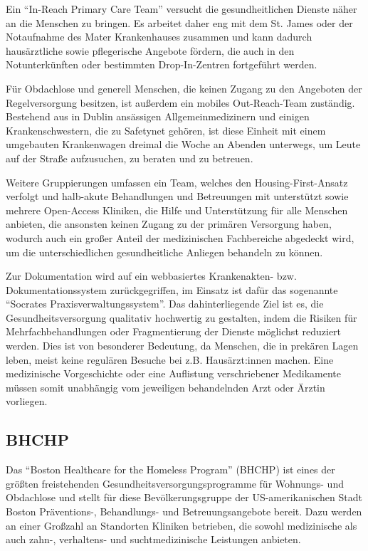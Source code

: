 Ein \enquote{In-Reach Primary Care Team} versucht die gesundheitlichen Dienste näher an die Menschen zu bringen. Es arbeitet daher eng mit dem St. James oder der Notaufnahme des Mater Krankenhauses zusammen und kann dadurch hausärztliche sowie pflegerische Angebote fördern, die auch in den Notunterkünften oder bestimmten Drop-In-Zentren fortgeführt werden.

Für Obdachlose und generell Menschen, die keinen Zugang zu den Angeboten der Regelversorgung besitzen, ist außerdem ein mobiles Out-Reach-Team zuständig. Bestehend aus in Dublin ansässigen Allgemeinmedizinern und einigen Krankenschwestern, die zu Safetynet gehören, ist diese Einheit mit einem umgebauten Krankenwagen dreimal die Woche an Abenden unterwegs, um Leute auf der Straße aufzusuchen, zu beraten und zu betreuen.

Weitere Gruppierungen umfassen ein Team, welches den Housing-First-Ansatz verfolgt und halb-akute Behandlungen und Betreuungen mit unterstützt sowie mehrere Open-Access Kliniken, die Hilfe und Unterstützung für alle Menschen anbieten, die ansonsten keinen Zugang zu der primären Versorgung haben, wodurch auch ein großer Anteil der medizinischen Fachbereiche abgedeckt wird, um die unterschiedlichen gesundheitliche Anliegen behandeln zu können.

Zur Dokumentation wird auf ein webbasiertes Krankenakten- bzw. Dokumentationssystem zurückgegriffen, im Einsatz ist dafür das sogenannte \enquote{Socrates Praxisverwaltungssystem}. Das dahinterliegende Ziel ist es, die Gesundheitsversorgung qualitativ hochwertig zu gestalten, indem die Risiken für Mehrfachbehandlungen oder Fragmentierung der Dienste möglichst reduziert werden. Dies ist von besonderer Bedeutung, da Menschen, die in prekären Lagen leben, meist keine regulären Besuche bei z.B. Hausärzt:innen machen. Eine medizinische Vorgeschichte oder eine Auflistung verschriebener Medikamente müssen somit unabhängig vom jeweiligen behandelnden Arzt oder Ärztin vorliegen. \nocite{Safetynet}

\subsection{BHCHP}

Das \enquote{Boston Healthcare for the Homeless Program} (BHCHP) ist eines der größten freistehenden Gesundheitsversorgungsprogramme für Wohnungs- und Obdachlose und stellt für diese Bevölkerungsgruppe der US-amerikanischen Stadt Boston Präventions-, Behandlungs- und Betreuungsangebote bereit. Dazu werden an einer Großzahl an Standorten Kliniken betrieben, die sowohl medizinische als auch zahn-, verhaltens- und suchtmedizinische Leistungen anbieten.

